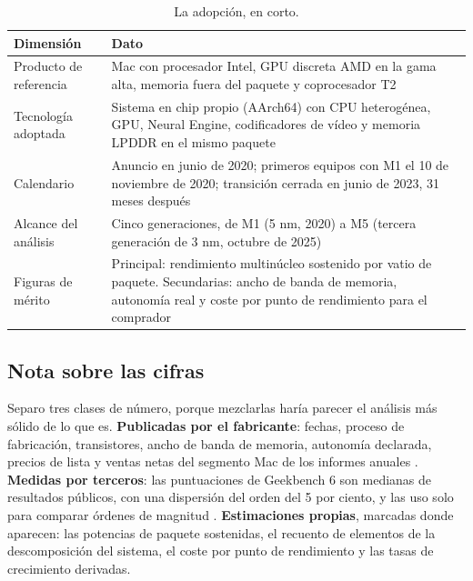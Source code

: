 \documentclass[11pt,letterpaper]{article}
\begin{document}
\begin{table}[H]
\small
\caption{La adopción, en corto.}
\label{cuadro:ficha}
\begin{tabularx}{\textwidth}{@{}p{4.3cm}X@{}}
\toprule
\textbf{Dimensión} & \textbf{Dato} \\
\midrule
Producto de referencia
& Mac con procesador Intel, GPU discreta AMD en la gama alta, memoria fuera
  del paquete y coprocesador T2 \\
\addlinespace[2pt]
Tecnología adoptada
& Sistema en chip propio (AArch64) con CPU heterogénea, GPU, Neural Engine,
  codificadores de vídeo y memoria LPDDR en el mismo paquete \\
\addlinespace[2pt]
Calendario
& Anuncio en junio de 2020; primeros equipos con M1 el 10 de noviembre de
  2020; transición cerrada en junio de 2023, 31 meses después
  \autocite{apple2020m1,apple2023macpro} \\
\addlinespace[2pt]
Alcance del análisis
& Cinco generaciones, de M1 (5 nm, 2020) a M5 (tercera generación de 3 nm,
  octubre de 2025) \autocite{apple2025m5} \\
\addlinespace[2pt]
Figuras de mérito
& Principal: rendimiento multinúcleo sostenido por vatio de paquete.
  Secundarias: ancho de banda de memoria, autonomía real y coste por punto de
  rendimiento para el comprador \\
\bottomrule
\end{tabularx}
\end{table}

\subsection*{Nota sobre las cifras}

Separo tres clases de número, porque mezclarlas haría parecer el análisis más
sólido de lo que es. \textbf{Publicadas por el fabricante}: fechas, proceso de
fabricación, transistores, ancho de banda de memoria, autonomía declarada,
precios de lista y ventas netas del segmento Mac de los informes anuales
\autocite{apple10k}. \textbf{Medidas por terceros}: las puntuaciones de
Geekbench 6 son medianas de resultados públicos, con una dispersión del orden
del 5 por ciento, y las uso solo para comparar órdenes de magnitud
\autocite{geekbench2026}. \textbf{Estimaciones propias}, marcadas donde
aparecen: las potencias de paquete sostenidas, el recuento de elementos de la
descomposición del sistema, el coste por punto de rendimiento y las tasas de
crecimiento derivadas.
\end{document}
